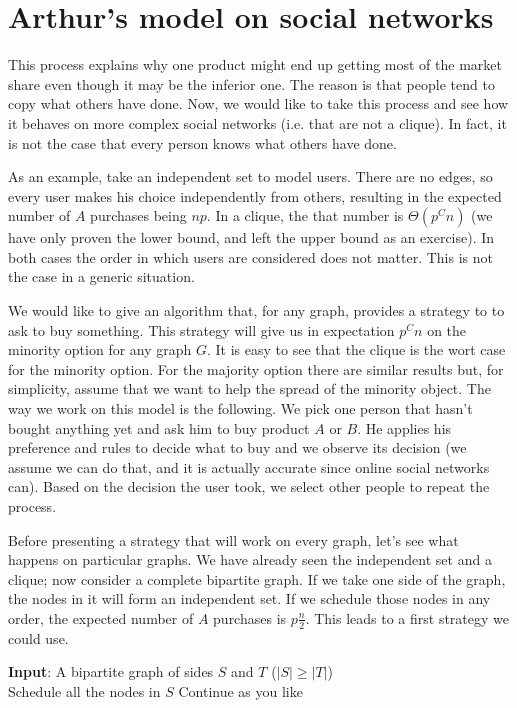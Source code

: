 \section{Arthur's model on social networks}

This process explains why one product might end up getting most of the market share even though it may be the inferior one. The reason is that people tend to copy what others have done. Now, we would like to take this process and see how it behaves on more complex social networks (i.e. that are not a clique). In fact, it is not the case that every person knows what others have done.

As an example, take an independent set to model users. There are no edges, so every user makes his choice independently from others, resulting in the expected number of $A$ purchases being $np$. In a clique, the that number is $\Theta(p^Cn)$ (we have only proven the lower bound, and left the upper bound as an exercise). In both cases the order in which users are considered does not matter. This is not the case in a generic situation.

We would like to give an algorithm that, for any graph, provides a strategy to to ask to buy something. This strategy will give us in expectation $p^Cn$ on the minority option for any graph $G$. It is easy to see that the clique is the wort case for the minority option. For the majority option there are similar results but, for simplicity, assume that we want to help the spread of the minority object. The way we work on this model is the following. We pick one person that hasn't bought anything yet and ask him to buy product $A$ or $B$. He applies his preference and rules to decide what to buy and we observe its decision (we assume we can do that, and it is actually accurate since online social networks can). Based on the decision the user took, we select other people to repeat the process. 

Before presenting a strategy that will work on every graph, let's see what happens on particular graphs. We have already seen the independent set and a clique; now consider a complete bipartite graph. If we take one side of the graph, the nodes in it will form an independent set. If we schedule those nodes in any order, the expected number of $A$ purchases is $p\frac{n}{2}$. This leads to a first strategy we could use.

\begin{algorithm}
	\textbf{Input}: A bipartite graph of sides $S$ and $T$ ($|S| \geq |T|$)\\
	Schedule all the nodes in $S$\;
	Continue as you like\;
\end{algorithm}

